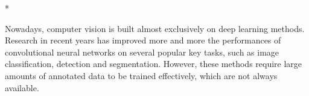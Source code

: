 \documentclass[%
    corpo=12pt,
    twoside,
    stile=classica,   
    tipotesi=magistrale,
    evenboxes,
    english,
	numerazioneromana,
]{toptesi}
\begin{document}
\english

\begin{ThesisTitlePage}*
% 
\def\Candidato{Candidate}

\end{ThesisTitlePage}

\vspace*{\fill}
\doclicenseThis

\sommario
Nowadays, computer vision is built almost exclusively on deep learning methods. Research in recent years has improved more and more the performances of convolutional neural networks on several popular key tasks, such as image classification, detection and segmentation. However, these methods require large amounts of annotated data to be trained effectively, which are not always available.
\end{document}
